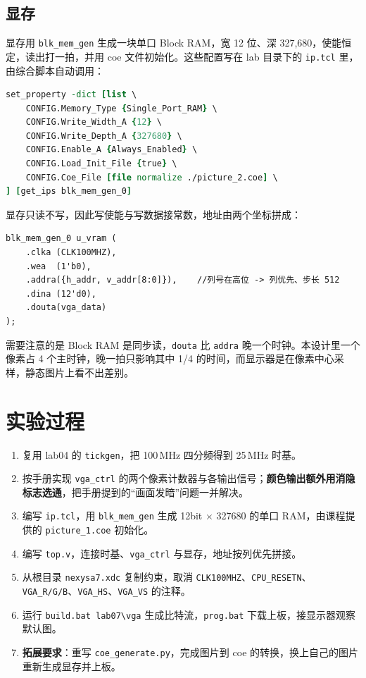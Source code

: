 \documentclass[12pt, a4paper]{ctexart}
\begin{document}
\subsection{显存}
显存用 \texttt{blk\_mem\_gen} 生成一块单口 Block RAM，宽 12 位、深 327{,}680，使能恒定，读出打一拍，并用 coe 文件初始化。这些配置写在 lab 目录下的 \texttt{ip.tcl} 里，由综合脚本自动调用：

\begin{lstlisting}[language=tcl]
set_property -dict [list \
    CONFIG.Memory_Type {Single_Port_RAM} \
    CONFIG.Write_Width_A {12} \
    CONFIG.Write_Depth_A {327680} \
    CONFIG.Enable_A {Always_Enabled} \
    CONFIG.Load_Init_File {true} \
    CONFIG.Coe_File [file normalize ./picture_2.coe] \
] [get_ips blk_mem_gen_0]
\end{lstlisting}

\noindent 显存只读不写，因此写使能与写数据接常数，地址由两个坐标拼成：

\begin{lstlisting}
blk_mem_gen_0 u_vram (
    .clka (CLK100MHZ),
    .wea  (1'b0),
    .addra({h_addr, v_addr[8:0]}),    //列号在高位 -> 列优先、步长 512
    .dina (12'd0),
    .douta(vga_data)
);
\end{lstlisting}

\noindent 需要注意的是 Block RAM 是同步读，\texttt{douta} 比 \texttt{addra} 晚一个时钟。本设计里一个像素占 4 个主时钟，晚一拍只影响其中 1/4 的时间，而显示器是在像素中心采样，静态图片上看不出差别。

\section{实验过程}
\begin{enumerate}
    \item 复用 lab04 的 \texttt{tickgen}，把 100\,MHz 四分频得到 25\,MHz 时基。
    \item 按手册实现 \texttt{vga\_ctrl} 的两个像素计数器与各输出信号；\textbf{颜色输出额外用消隐标志选通}，把手册提到的“画面发暗”问题一并解决。
    \item 编写 \texttt{ip.tcl}，用 \texttt{blk\_mem\_gen} 生成 12bit $\times$ 327680 的单口 RAM，由课程提供的 \texttt{picture\_1.coe} 初始化。
    \item 编写 \texttt{top.v}，连接时基、\texttt{vga\_ctrl} 与显存，地址按列优先拼接。
    \item 从根目录 \texttt{nexysa7.xdc} 复制约束，取消 \texttt{CLK100MHZ}、\texttt{CPU\_RESETN}、\texttt{VGA\_R/G/B}、\texttt{VGA\_HS}、\texttt{VGA\_VS} 的注释。
    \item 运行 \texttt{build.bat lab07\textbackslash vga} 生成比特流，\texttt{prog.bat} 下载上板，接显示器观察默认图。
    \item \textbf{拓展要求}：重写 \texttt{coe\_generate.py}，完成图片到 coe 的转换，换上自己的图片重新生成显存并上板。
\end{enumerate}
\end{document}
